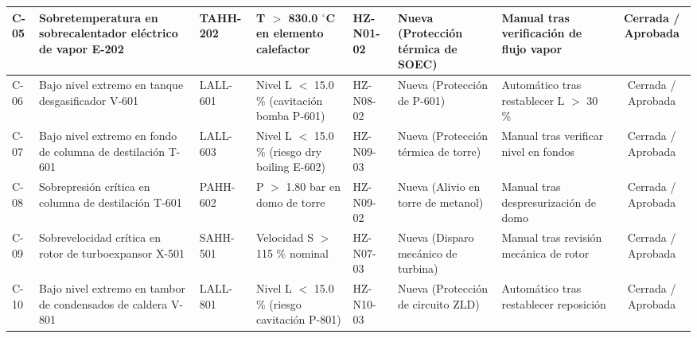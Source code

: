 \documentclass[10pt,letterpaper]{article}
\begin{document}
\begin{landscape}
\begin{xltabular}{\linewidth}{|l|>{\raggedright\arraybackslash}X|p{2.2cm}|p{2.6cm}|l|p{2.6cm}|p{2.4cm}|c|}
C-05 & Sobretemperatura en sobrecalentador eléctrico de vapor E-202 & TAHH-202 & T $>$ 830.0 $^\circ$C en elemento calefactor & HZ-N01-02 & Nueva (Protección térmica de SOEC) & Manual tras verificación de flujo vapor & Cerrada / Aprobada \\ \hline
C-06 & Bajo nivel extremo en tanque desgasificador V-601 & LALL-601 & Nivel L $<$ 15.0 \% (cavitación bomba P-601) & HZ-N08-02 & Nueva (Protección de P-601) & Automático tras restablecer L $>$ 30 \% & Cerrada / Aprobada \\ \hline
C-07 & Bajo nivel extremo en fondo de columna de destilación T-601 & LALL-603 & Nivel L $<$ 15.0 \% (riesgo dry boiling E-602) & HZ-N09-03 & Nueva (Protección térmica de torre) & Manual tras verificar nivel en fondos & Cerrada / Aprobada \\ \hline
C-08 & Sobrepresión crítica en columna de destilación T-601 & PAHH-602 & P $>$ 1.80 bar en domo de torre & HZ-N09-02 & Nueva (Alivio en torre de metanol) & Manual tras despresurización de domo & Cerrada / Aprobada \\ \hline
C-09 & Sobrevelocidad crítica en rotor de turboexpansor X-501 & SAHH-501 & Velocidad S $>$ 115 \% nominal & HZ-N07-03 & Nueva (Disparo mecánico de turbina) & Manual tras revisión mecánica de rotor & Cerrada / Aprobada \\ \hline
C-10 & Bajo nivel extremo en tambor de condensados de caldera V-801 & LALL-801 & Nivel L $<$ 15.0 \% (riesgo cavitación P-801) & HZ-N10-03 & Nueva (Protección de circuito ZLD) & Automático tras restablecer reposición & Cerrada / Aprobada \\ \hline
\end{xltabular}
\end{landscape}
\newpage
\end{document}
